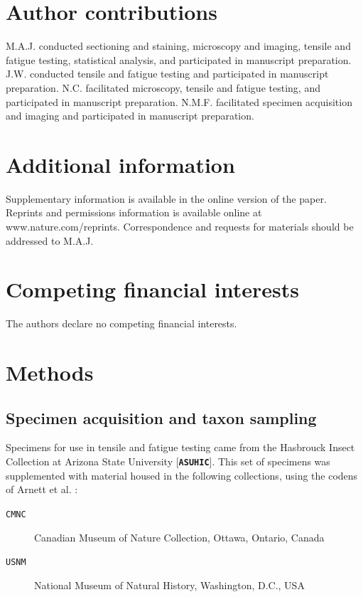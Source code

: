 \documentclass[twocolumn, linenumbers, superscriptaddress, nofootinbib]{revtex4-1}
\begin{document}
	\section*{Author contributions}
		M.A.J. conducted sectioning and staining, microscopy and imaging, tensile and fatigue testing, statistical analysis, and participated in manuscript preparation.
		J.W. conducted tensile and fatigue testing and participated in manuscript preparation.
		N.C. facilitated microscopy, tensile and fatigue testing, and participated in manuscript preparation.
		N.M.F. facilitated specimen acquisition and imaging and participated in manuscript preparation.
	
	\section*{Additional information}
		Supplementary information is available in the online version of the paper.
		Reprints and permissions information is available online at www.nature.com/reprints.
		Correspondence and requests for materials should be addressed to M.A.J.
	
	\section*{Competing financial interests}
		The authors declare no competing financial interests.
	
	\newpage

	\section*{Methods}
		\subsection*{Specimen acquisition and taxon sampling}
			Specimens for use in tensile and fatigue testing came from the Hasbrouck Insect Collection at Arizona State University [\textbf{\texttt{ASUHIC}}].  This set of specimens was supplemented with material housed in the following collections, using the codens of Arnett et al. \cite{Arnett1993}:
			
			\begin{description}
				\item [\texttt{CMNC}]  Canadian Museum of Nature Collection, Ottawa, Ontario, Canada
				\item [\texttt{USNM}]  National Museum of Natural History, Washington, D.C., USA
			\end{description}
		
\end{document}
